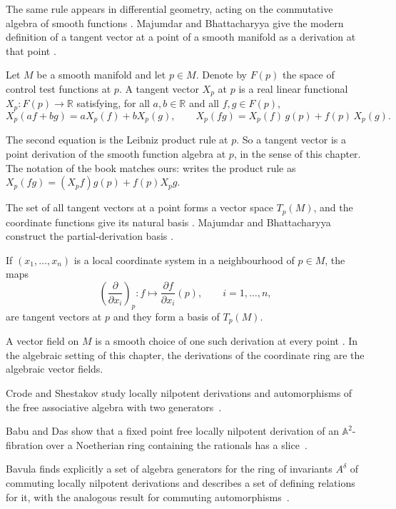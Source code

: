 The same rule appears in differential geometry, acting on the
commutative algebra of smooth functions
\cite[p.~70]{MajumdarBhattacharyya2023}. Majumdar and
Bhattacharyya give the modern definition of a tangent vector at a point of a
smooth manifold as a derivation at that point \cite{MajumdarBhattacharyya2023}.

\begin{definition}\label{def:comm:tangent-derivation}
Let $M$ be a smooth manifold and let $p\in M$. Denote by $F(p)$ the space of control
test functions at $p$. A tangent vector $X_p$ at $p$ is a real linear functional
$X_p\colon F(p)\to\mathbb{R}$ satisfying, for all $a,b\in\mathbb{R}$ and all
$f,g\in F(p)$,
\[
X_p(af+bg) = a X_p(f) + b X_p(g),\qquad
X_p(fg) = X_p(f)\,g(p) + f(p)\,X_p(g).
\]
\end{definition}

The second equation is the Leibniz product rule at $p$. So a tangent vector
is a point derivation of the smooth function algebra at $p$, in the sense of
this chapter. The notation of the book matches ours:
\cite[equation (2.17), p.~70]{MajumdarBhattacharyya2023} writes the product rule
as $X_p(fg)=(X_p f)g(p)+f(p)X_p g$.

The set of all tangent vectors at a point forms a vector space $T_p(M)$, and
the coordinate functions give its natural basis \cite[equation (2.19),
p.~70]{MajumdarBhattacharyya2023}. Majumdar and Bhattacharyya construct
the partial-derivation basis \cite[equation (2.19), p.~70]{MajumdarBhattacharyya2023}.

\begin{definition}\label{def:comm:coordinate-basis}
If $(x_1,\dots,x_n)$ is a local coordinate system in a neighbourhood of $p\in M$, the maps
\[
\left(\frac{\partial}{\partial x_i}\right)_p\colon f\longmapsto
\frac{\partial f}{\partial x_i}(p),\qquad i=1,\dots,n,
\]
are tangent vectors at $p$ and they form a basis of $T_p(M)$.
\end{definition}

A vector field on $M$ is a smooth choice of one such derivation at every
point %
\cite[p.~70]{MajumdarBhattacharyya2023}. In the algebraic setting of
this chapter, the derivations of the coordinate ring are the
algebraic vector fields.

Crode and Shestakov study locally nilpotent derivations and automorphisms of the free associative algebra with two generators~\cite{WlLocallyNilpotentDerivationsAnd2020}.

Babu and Das show that a fixed point free locally nilpotent derivation of an $\mathbb{A}^2$-fibration over a Noetherian ring containing the rationals has a slice~\cite{WlStructureOfA2FibrationsHavingF2021}.

Bavula finds explicitly a set of algebra generators for the ring of invariants $A^\delta$ of commuting locally nilpotent derivations and describes a set of defining relations for it, with the analogous result for commuting automorphisms~\cite{WlGeneratorsAndDefiningRelations2006}.
